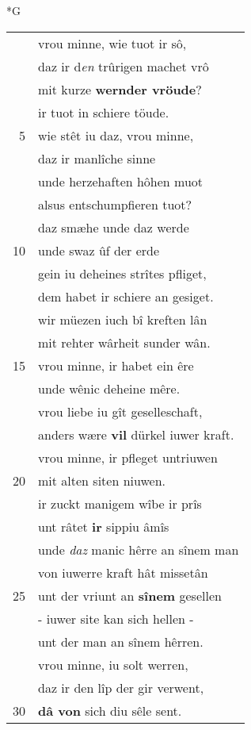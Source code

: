 \documentclass[8pt,a4paper,notitlepage]{article}
\begin{document}
\begin{table}[ht]
\begin{minipage}[t]{0.5\linewidth}
\small
\begin{center}*G
\end{center}
\begin{tabular}{rl}
 & vrou minne, wie tuot ir sô,\\ 
 & daz ir d\textit{en} trûrigen machet vrô\\ 
 & mit kurze \textbf{wernder vröude}?\\ 
 & ir tuot in schiere töude.\\ 
5 & wie stêt iu daz, vrou minne,\\ 
 & daz ir manlîche sinne\\ 
 & unde herzehaften hôhen muot\\ 
 & alsus entschumpfieren tuot?\\ 
 & daz smæhe unde daz werde\\ 
10 & unde swaz ûf der erde\\ 
 & gein iu deheines strîtes pfliget,\\ 
 & dem habet ir schiere an gesiget.\\ 
 & wir müezen iuch bî kreften lân\\ 
 & mit rehter wârheit sunder wân.\\ 
15 & vrou minne, ir habet ein êre\\ 
 & unde wênic deheine mêre.\\ 
 & vrou liebe iu gît geselleschaft,\\ 
 & anders wære \textbf{vil} dürkel iuwer kraft.\\ 
 & vrou minne, ir pfleget untriuwen\\ 
20 & mit alten siten niuwen.\\ 
 & ir zuckt manigem wîbe ir prîs\\ 
 & unt râtet \textbf{ir} sippiu âmîs\\ 
 & unde \textit{daz} manic hêrre an sînem man\\ 
 & von iuwerre kraft hât missetân\\ 
25 & unt der vriunt an \textbf{sînem} gesellen\\ 
 & - iuwer site kan sich hellen -\\ 
 & unt der man an sînem hêrren.\\ 
 & vrou minne, iu solt werren,\\ 
 & daz ir den lîp der gir verwent,\\ 
30 & \textbf{dâ von} sich diu sêle sent.\\ 

\end{tabular}
\end{minipage}
\end{table}
\end{document}
